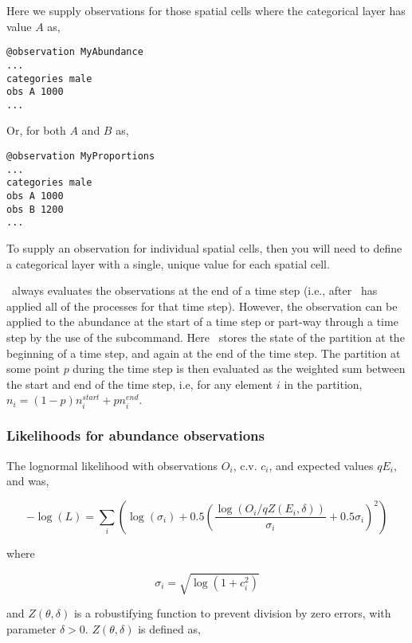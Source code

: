 Here we supply observations for those spatial cells where the categorical layer has value $A$ as, 

\begin{verbatim}
@observation MyAbundance
...
categories male 
obs A 1000
...
\end{verbatim}

Or, for both $A$ and $B$ as,

\begin{verbatim}
@observation MyProportions
...
categories male
obs A 1000
obs B 1200
...
\end{verbatim}

To supply an observation for individual spatial cells, then you will need to define a categorical layer with a single, unique value for each spatial cell. 

\SPM\ always evaluates the observations at the end of a time step (i.e., after \SPM\ has applied all of the processes for that time step). However, the observation can be applied to the abundance at the start of a time step or part-way through a time step by the use of the  subcommand. Here \SPM\ stores the state of the partition at the beginning of a time step, and again at the end of the time step. The partition at some point $p$ during the time step is then evaluated as the weighted sum between the start and end of the time step, i.e, for any element $i$ in the partition, $n_i=(1-p) n_i^{start} + p n_i^{end}$.

\subsubsection{Likelihoods for abundance observations}

The lognormal likelihood with observations $O_i$, c.v. $c_i$, and expected values $qE_i$, and was,

\begin{equation}
 - \log \left(L \right) = \sum\limits_i \left( \log \left( \sigma _i \right) + 0.5\left( \frac{\log \left(O_i / q Z \left(E_i,\delta \right) \right)}{\sigma_i} + 0.5 \sigma_i \right)^2 \right)
\end{equation}

where 

\begin{equation}
  \sigma_i  = \sqrt{\log \left(1+c_i^2 \right)}
\end{equation}

and $Z \left(\theta,\delta \right)$ is a robustifying function to prevent division by zero errors, with parameter $\delta>0$. $Z \left(\theta,\delta \right)$ is defined as,

